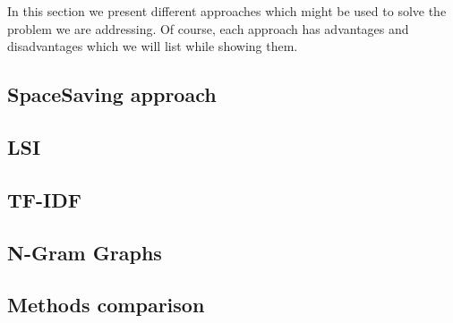 In this section we present different approaches which might be used to solve the problem we are addressing. Of course, each approach has advantages and disadvantages which we will list while showing them.

\subsection*{SpaceSaving approach}


\subsection*{LSI}


\subsection*{TF-IDF}


\subsection*{N-Gram Graphs}


\subsection*{Methods comparison}

